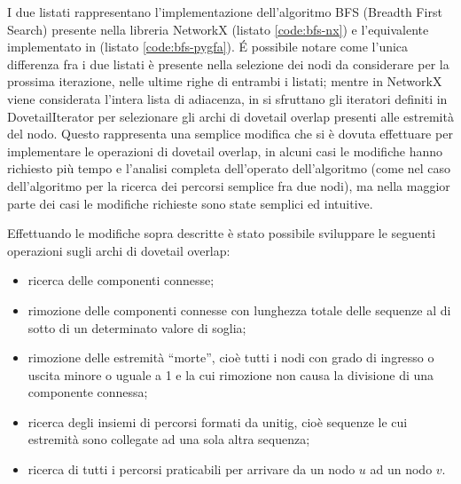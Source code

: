 I due listati rappresentano l'implementazione dell'algoritmo BFS (Breadth First Search) presente
nella libreria NetworkX (listato \ref{code:bfs-nx}) e l'equivalente implementato in \pygfa
(listato \ref{code:bfs-pygfa}). \'E possibile notare come l'unica differenza fra i due listati
è presente nella selezione dei nodi da considerare per la prossima iterazione, nelle ultime
righe di entrambi i listati; mentre in NetworkX viene considerata l'intera lista di adiacenza, in
\pygfa si sfruttano gli iteratori definiti in DovetailIterator per selezionare gli archi di dovetail overlap
presenti alle estremità del nodo.
Questo rappresenta una semplice modifica che si è dovuta effettuare per
implementare le operazioni di dovetail overlap, in alcuni casi le modifiche
hanno richiesto più tempo e l'analisi completa dell'operato dell'algoritmo (come nel
caso dell'algoritmo per la ricerca dei percorsi semplice fra due nodi),
ma nella maggior parte dei casi le modifiche richieste sono state semplici
ed intuitive.

Effettuando le modifiche sopra descritte è stato possibile sviluppare
le seguenti operazioni sugli archi di dovetail overlap:
\begin{itemize}
	\item ricerca delle componenti connesse;
	\item rimozione delle componenti connesse con lunghezza
		totale delle sequenze al di sotto di un determinato valore di soglia;
	\item rimozione delle estremità ``morte'', cioè tutti i nodi con
		grado di ingresso o uscita minore o uguale a 1 e la cui rimozione non causa
		la divisione di una componente connessa;
	\item ricerca degli insiemi di percorsi formati da unitig, cioè sequenze
		le cui estremità sono collegate ad una sola altra sequenza;
	\item ricerca di tutti i percorsi praticabili per arrivare da un nodo $u$ ad
		un nodo $v$.
\end{itemize}


